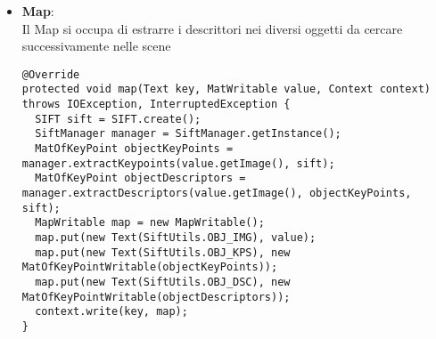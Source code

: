\begin{itemize}
	\item \textbf{Map}:\\
	      Il Map si occupa di estrarre i descrittori nei diversi oggetti da cercare successivamente nelle scene
\begin{lstlisting}
@Override
protected void map(Text key, MatWritable value, Context context) throws IOException, InterruptedException {
  SIFT sift = SIFT.create();
  SiftManager manager = SiftManager.getInstance();
  MatOfKeyPoint objectKeyPoints = manager.extractKeypoints(value.getImage(), sift);
  MatOfKeyPoint objectDescriptors = manager.extractDescriptors(value.getImage(), objectKeyPoints, sift);
  MapWritable map = new MapWritable();
  map.put(new Text(SiftUtils.OBJ_IMG), value);
  map.put(new Text(SiftUtils.OBJ_KPS), new MatOfKeyPointWritable(objectKeyPoints));
  map.put(new Text(SiftUtils.OBJ_DSC), new MatOfKeyPointWritable(objectDescriptors));
  context.write(key, map);
}
\end{lstlisting}


\end{itemize}
